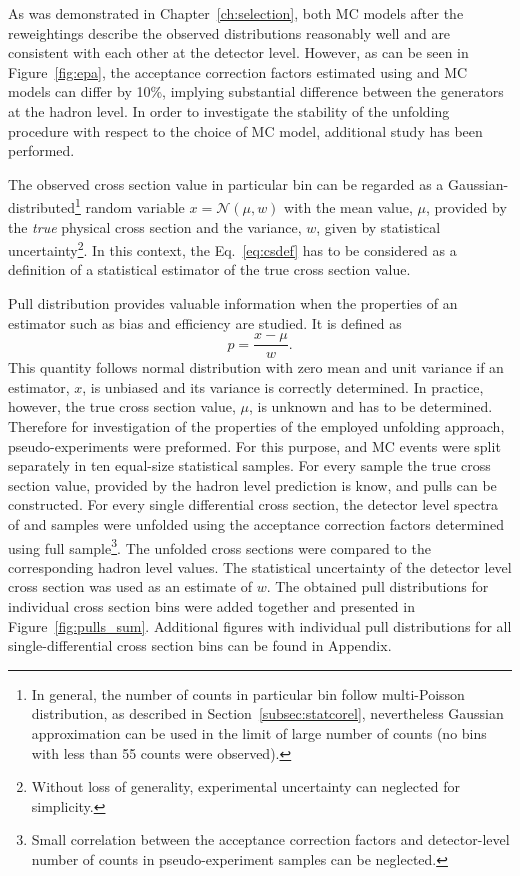 As was demonstrated in Chapter~\ref{ch:selection}, both MC models after the reweightings describe the observed distributions reasonably well and are consistent with each other at the detector level. However, as can be seen in Figure~\ref{fig:epa}, the acceptance correction factors estimated using \ariadne and \lepto MC models can differ by 10\%, implying substantial difference between the generators at the hadron level. In order to investigate the stability of the unfolding procedure with respect to the choice of MC model, additional study has been performed.

The observed cross section value in particular bin can be regarded as a Gaussian-distributed\footnote{In general, the number of counts in particular bin follow multi-Poisson distribution, as described in Section~\ref{subsec:statcorel}, nevertheless Gaussian approximation can be used in the limit of large number of counts (no bins with less than 55 counts were observed).} random variable $x = \mathcal{N}\left(\mu,w\right)$ with the mean value, $\mu$, provided by the \textit{true} physical cross section and the variance, $w$, given by statistical uncertainty\footnote{Without loss of generality, experimental uncertainty can neglected for simplicity.}. In this context, the Eq.~\eqref{eq:csdef} has to be considered as a definition of a statistical estimator of the true cross section value.

Pull distribution provides valuable information when the properties of an estimator such as bias and efficiency are studied. It is defined as 
\begin{equation}
p=\frac{x-\mu}{w}.
\label{eq:pulldef}
\end{equation}
This quantity follows normal distribution with zero mean and unit variance if an estimator, $x$, is unbiased and its variance is correctly determined. In practice, however, the true cross section value, $\mu$, is unknown and has to be determined. Therefore for investigation of the properties of the employed unfolding approach, pseudo-experiments were preformed. For this purpose, \lepto and \ariadne MC events were split separately in ten equal-size statistical samples. For every sample the true cross section value, provided by the hadron level prediction is know, and pulls can be constructed. For every single differential cross section, the detector level spectra of \lepto and \ariadne samples were unfolded using the acceptance correction factors determined using full \lepto sample\footnote{Small correlation between the acceptance correction factors and detector-level number of counts in \lepto pseudo-experiment samples can be neglected.}. The unfolded cross sections were compared to the corresponding hadron level values. The statistical uncertainty of the detector level cross section was used as an estimate of $w$. The obtained pull distributions for individual cross section bins were added together and presented in Figure~\ref{fig:pulls_sum}. Additional figures with individual pull distributions for all single-differential cross section bins can be found in Appendix.

